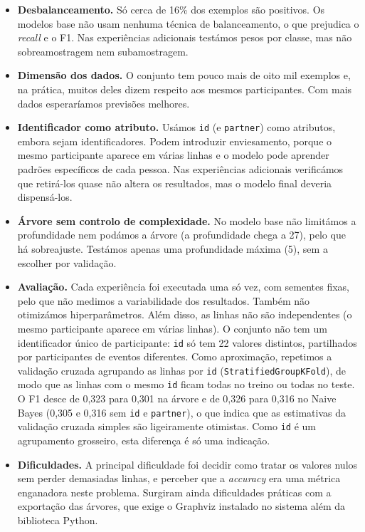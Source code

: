 \documentclass[12pt,a4paper]{article}
\newcommand{\code}[1]{\texttt{#1}}
\begin{document}
\begin{itemize}
  \item \textbf{Desbalanceamento.} Só cerca de 16\% dos exemplos são positivos. Os modelos base não usam nenhuma técnica de balanceamento, o que prejudica o \emph{recall} e o F1. Nas experiências adicionais testámos pesos por classe, mas não sobreamostragem nem subamostragem.
  \item \textbf{Dimensão dos dados.} O conjunto tem pouco mais de oito mil exemplos e, na prática, muitos deles dizem respeito aos mesmos participantes. Com mais dados esperaríamos previsões melhores.
  \item \textbf{Identificador como atributo.} Usámos \code{id} (e \code{partner}) como atributos, embora sejam identificadores. Podem introduzir enviesamento, porque o mesmo participante aparece em várias linhas e o modelo pode aprender padrões específicos de cada pessoa. Nas experiências adicionais verificámos que retirá-los quase não altera os resultados, mas o modelo final deveria dispensá-los.
  \item \textbf{Árvore sem controlo de complexidade.} No modelo base não limitámos a profundidade nem podámos a árvore (a profundidade chega a 27), pelo que há sobreajuste. Testámos apenas uma profundidade máxima (5), sem a escolher por validação.
  \item \textbf{Avaliação.} Cada experiência foi executada uma só vez, com sementes fixas, pelo que não medimos a variabilidade dos resultados. Também não otimizámos hiperparâmetros. Além disso, as linhas não são independentes (o mesmo participante aparece em várias linhas). O conjunto não tem um identificador único de participante: \code{id} só tem 22 valores distintos, partilhados por participantes de eventos diferentes. Como aproximação, repetimos a validação cruzada agrupando as linhas por \code{id} (\code{StratifiedGroupKFold}), de modo que as linhas com o mesmo \code{id} ficam todas no treino ou todas no teste. O F1 desce de 0,323 para 0,301 na árvore e de 0,326 para 0,316 no Naive Bayes (0,305 e 0,316 sem \code{id} e \code{partner}), o que indica que as estimativas da validação cruzada simples são ligeiramente otimistas. Como \code{id} é um agrupamento grosseiro, esta diferença é só uma indicação.
  \item \textbf{Dificuldades.} A principal dificuldade foi decidir como tratar os valores nulos sem perder demasiadas linhas, e perceber que a \emph{accuracy} era uma métrica enganadora neste problema. Surgiram ainda dificuldades práticas com a exportação das árvores, que exige o Graphviz instalado no sistema além da biblioteca Python.
\end{itemize}
\end{document}
